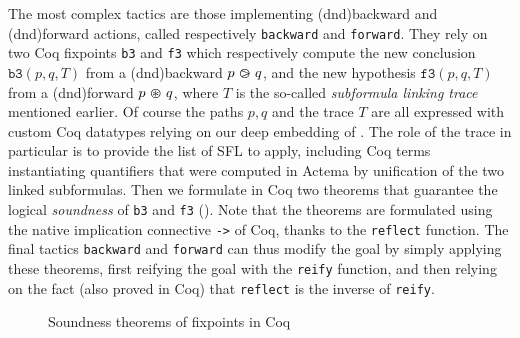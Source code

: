 The most complex tactics are those implementing \kl(dnd){backward} and \kl(dnd){forward} 
actions, called respectively \texttt{backward} and \texttt{forward}. They rely
on two Coq fixpoints \texttt{b3} and \texttt{f3} which respectively compute the
new conclusion $\mathtt{b3}(p, q, T)$ from a \kl(dnd){backward}  $p \operatorname{\,\varogreaterthan\,} q$, and
the new hypothesis $\mathtt{f3}(p, q, T)$ from a \kl(dnd){forward}  $p \operatorname{\,\varoast\,} q$,
where $T$ is the so-called \emph{subformula linking trace} mentioned earlier. Of
course the paths $p, q$ and the trace $T$ are all expressed with custom Coq
datatypes relying on our deep embedding of . The role of the
trace in particular is to provide the list of SFL  to apply,
including Coq terms instantiating quantifiers that were computed in Actema by
unification of the two linked subformulas. Then we formulate in Coq two theorems
that guarantee the logical \emph{soundness} of \texttt{b3} and \texttt{f3}
(). Note that the theorems are formulated using the native
implication connective \texttt{->} of Coq, thanks to the \texttt{reflect}
function. The final tactics \texttt{backward} and \texttt{forward} can thus
modify the goal by simply applying these theorems, first reifying the goal with
the \texttt{reify} function, and then relying on the fact (also proved in Coq)
that \texttt{reflect} is the inverse of \texttt{reify}.

\begin{figure}
  
  \caption{Soundness theorems of  fixpoints in Coq}
\end{figure}


